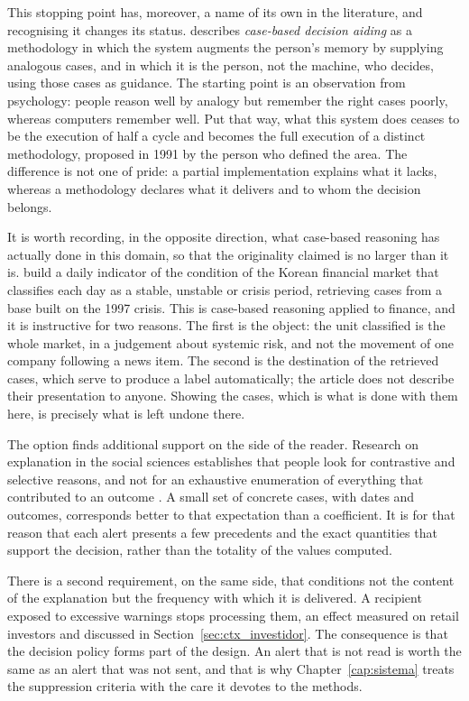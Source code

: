 This stopping point has, moreover, a name of its own in the literature, and recognising it changes
its status. \textcite{kolodner1991aiding} describes \emph{case-based decision aiding} as a
methodology in which the system augments the person's memory by supplying analogous cases, and in
which it is the person, not the machine, who decides, using those cases as guidance. The starting
point is an observation from psychology: people reason well by analogy but remember the right cases
poorly, whereas computers remember well. Put that way, what this system does ceases to be the
execution of half a cycle and becomes the full execution of a distinct methodology, proposed in
1991 by the person who defined the area. The difference is not one of pride: a partial
implementation explains what it lacks, whereas a methodology declares what it delivers and to whom
the decision belongs.

It is worth recording, in the opposite direction, what case-based reasoning has actually done in
this domain, so that the originality claimed is no larger than it is.
\textcite{oh2007cbrmonitoring} build a daily indicator of the condition of the Korean financial
market that classifies each day as a stable, unstable or crisis period, retrieving cases from a
base built on the 1997 crisis. This is case-based reasoning applied to finance, and it is
instructive for two reasons. The first is the object: the unit classified is the whole market, in a
judgement about systemic risk, and not the movement of one company following a news item. The
second is the destination of the retrieved cases, which serve to produce a label automatically; the
article does not describe their presentation to anyone. Showing the cases, which is what is done
with them here, is precisely what is left undone there.

The option finds additional support on the side of the reader. Research on explanation in the
social sciences establishes that people look for contrastive and selective reasons, and not for an
exhaustive enumeration of everything that contributed to an outcome
\autocite{miller2019explanation}. A small set of concrete cases, with dates and outcomes,
corresponds better to that expectation than a coefficient. It is for that reason that each alert
presents a few precedents and the exact quantities that support the decision, rather than the
totality of the values computed.

There is a second requirement, on the same side, that conditions not the content of the explanation
but the frequency with which it is delivered. A recipient exposed to excessive warnings stops
processing them, an effect measured on retail investors \autocite{liu2023alerts} and discussed
in Section~\ref{sec:ctx_investidor}. The consequence is that the decision policy forms part of the
design. An alert that is not read is worth the same as an alert that was not sent,
and that is why Chapter~\ref{cap:sistema} treats the suppression criteria with the care it devotes
to the methods.


